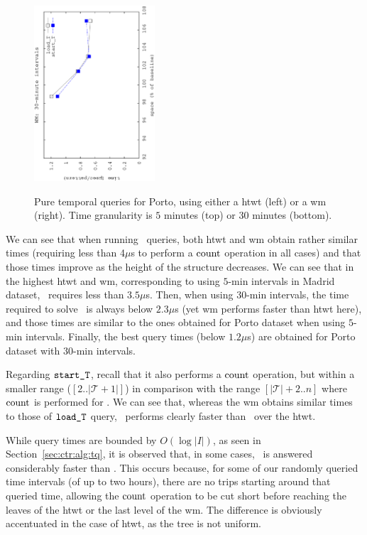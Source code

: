 \begin{figure}[ht]
\begin{center}
				{\includegraphics[angle=-90,width=0.4\textwidth]{figures_synt/porto_t30mwm.eps}}
		\end{center}
		\caption{Pure temporal queries for Porto, using either a \acrshort{htwt} (left) or a \acrshort{wm} (right). 
			Time granularity is $5$ minutes (top) or $30$ minutes (bottom).}
		\label{fig:ctr:exp:queries:temp:porto}
	\end{figure}



	We can see that when running \loadT\ queries, both \gls{htwt} and \gls{wm} obtain rather similar times (requiring less than 4$\mu$s 
	to perform a $\operatorname{count}$ operation in all cases) and that those times improve as the height of the structure decreases. We can see 
	that in the highest \gls{htwt} and \gls{wm}, corresponding to using $5$-min intervals in Madrid dataset, \loadT\ requires less
	than $3.5\mu$s. Then, when using $30$-min intervals, the time required to solve \loadT\ is always below $2.3\mu$s (yet
	\gls{wm} performs faster than \gls{htwt} here), and those times are similar to the ones obtained for Porto dataset when
	using $5$-min intervals. Finally, the best query times (below $1.2\mu$s) are obtained for Porto dataset with 
	$30$-min intervals.

	Regarding $\texttt{start\_T}$, recall that it also performs a $\operatorname{count}$ operation, but within a smaller range ($[2..|\mathcal{T}+1|]$) in comparison with the range
	$[|\mathcal{T}|+2..n]$ where  $\operatorname{count}$ is performed for \loadT. We can see that, whereas the \gls{wm} obtains similar times to those of 
	$\texttt{load\_T}$ query,  \startT\ performs clearly faster than \loadT\ over the \gls{htwt}.
	
	While query times are bounded by $O(\log|I|)$, as seen in Section~\ref{sec:ctr:alg:tq}, it is observed that, in some cases, \startT\ is answered considerably faster than \loadT. This occurs because, for some of our randomly queried time intervals (of up to two hours), there are no trips starting around that queried time, allowing the $\operatorname{count}$ operation to be cut short before reaching the leaves of the \gls{htwt} or the last level of the \gls{wm}. The difference is obviously accentuated in the case of \gls{htwt}, as the tree is not uniform.


